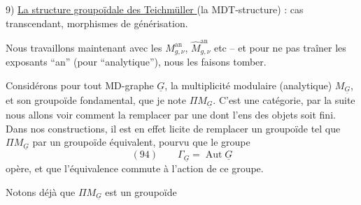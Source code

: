 9) \uline{La structure groupoïdale des  Teichmüller } (la MDT-structure) : cas transcendant, morphismes de générisation.

Nous travaillons maintenant avec les $M^{\mathrm{an}}_{g,\nu}$, $\widehat M^{\mathrm{an}}_{g,\nu}$ etc -- et pour ne pas traîner les exposants ``an'' (pour ``analytique''), nous les faisons tomber.

Considérons pour tout MD-graphe $\underline G$, la multiplicité modulaire (analytique) $M_{\underline G}$, et son groupoïde fondamental, que je note $\Pi M_{\underline G}$. C'est une  catégorie, par la suite nous allons voir comment la remplacer  par une   dont l'ens des objets soit fini. Dans nos constructions, il est en effet licite de remplacer un groupoïde tel que $\Pi M_{\underline G}$ par un groupoïde équivalent, pourvu que   le groupe
\[
(94)\qquad \Gamma_{\underline G}=\operatorname{Aut}\underline G
\]
opère, et que l'équivalence commute à l'action de ce groupe.

Notons déjà que $\Pi M_{\underline G}$ est un groupoïde
